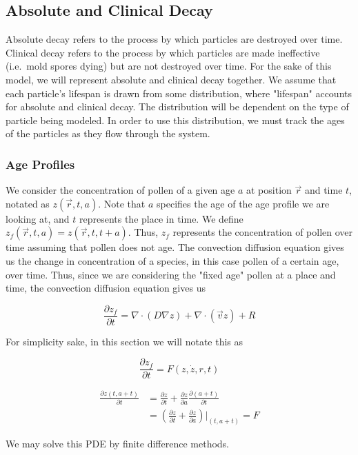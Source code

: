 \documentclass{article}
\begin{document}
\subsection{Absolute and Clinical Decay}

Absolute decay refers to the process by which particles are destroyed over time. Clinical decay refers to the process by which particles are made ineffective (i.e.\ mold spores dying) but are not destroyed over time. For the sake of this model, we will represent absolute and clinical decay together. We assume that each particle's lifespan is drawn from some distribution, where "lifespan" accounts for absolute and clinical decay. The distribution will be dependent on the type of particle being modeled. In order to use this distribution, we must track the ages of the particles as they flow through the system.

\subsubsection{Age Profiles}

We consider the concentration of pollen of a given age $a$ at position $\vec{r}$ and time $t$, notated as $z(\vec{r}, t, a)$. Note that $a$ specifies the age of the age profile we are looking at, and $t$ represents the place in time. We define $z_f(\vec{r}, t, a) = z(\vec{r}, t, t + a)$. Thus, $z_f$ represents the concentration of pollen over time assuming that pollen does not age. The convection diffusion equation gives us the change in concentration of a species, in this case pollen of a certain age, over time. Thus, since we are considering the "fixed age" pollen at a place and time, the convection diffusion equation gives us

\[ \frac{\partial z_f}{\partial t} = \nabla \cdot (D \nabla z) + \nabla \cdot (\vec{v} z) + R \]

For simplicity sake, in this section we will notate this as

\[ \frac{\partial z_f}{\partial t} = F(z, \dot{z}, r, t) \]

\begin{align*}
	\frac{\partial z (t, a+t)}{\partial t} &= \frac{\partial z}{\partial t} + \frac{\partial z}{\partial a} \frac{\partial (a + t)}{\partial t} \\
	&= (\frac{\partial z}{\partial t} + \frac{\partial z}{\partial a}) \Big\rvert_{(t, a+t)} = F
\end{align*}

We may solve this PDE by finite difference methods.
\end{document}
